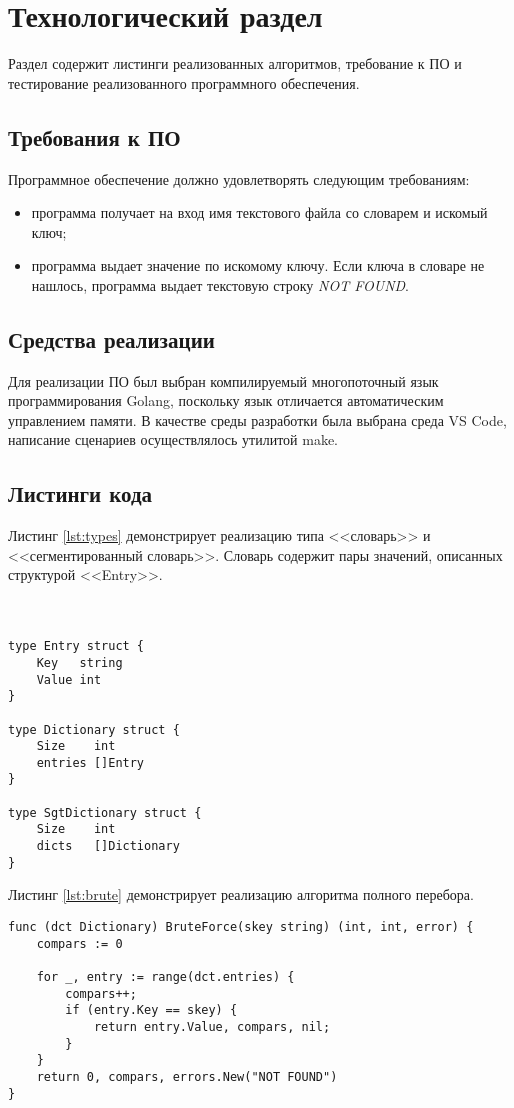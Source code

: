 \chapter{Технологический раздел}\label{sec:impl}

Раздел содержит листинги реализованных алгоритмов, требование к ПО
и тестирование реализованного программного обеспечения.

\section{Требования к ПО}
Программное обеспечение должно удовлетворять следующим требованиям:
\begin{itemize}
	\item программа получает на вход имя текстового файла со словарем и искомый ключ;
	\item программа выдает значение по искомому ключу. Если ключа в словаре не нашлось, программа выдает текстовую строку \textit{NOT FOUND}.
\end{itemize}

\section{Средства реализации} 
Для реализации ПО был выбран компилируемый многопоточный язык программирования Golang\cite{go}, поскольку язык отличается автоматическим управлением памяти. В качестве среды разработки была выбрана среда VS Code, написание сценариев осуществлялось утилитой make.
\section{Листинги кода}

Листинг \ref{lst:types} демонстрирует реализацию типа <<словарь>> и <<сегментированный словарь>>. Словарь содержит пары значений, описанных структурой <<Entry>>. \\ \\ \\
 
\captionsetup{singlelinecheck = false, justification=raggedright}
\begin{lstlisting}[label=lst:types,caption=Структуры данных]
type Entry struct {
	Key   string
	Value int
}

type Dictionary struct {
	Size    int
	entries []Entry
}

type SgtDictionary struct {
	Size    int
	dicts   []Dictionary
}
\end{lstlisting}
Листинг \ref{lst:brute} демонстрирует реализацию алгоритма полного перебора.
\captionsetup{singlelinecheck = false, justification=raggedright}
\begin{lstlisting}[label=lst:brute,caption=Полный перебор]
func (dct Dictionary) BruteForce(skey string) (int, int, error) {
	compars := 0
	
	for _, entry := range(dct.entries) {
		compars++;
		if (entry.Key == skey) {
			return entry.Value, compars, nil;
		}
	}
	return 0, compars, errors.New("NOT FOUND")
}
\end{lstlisting}

